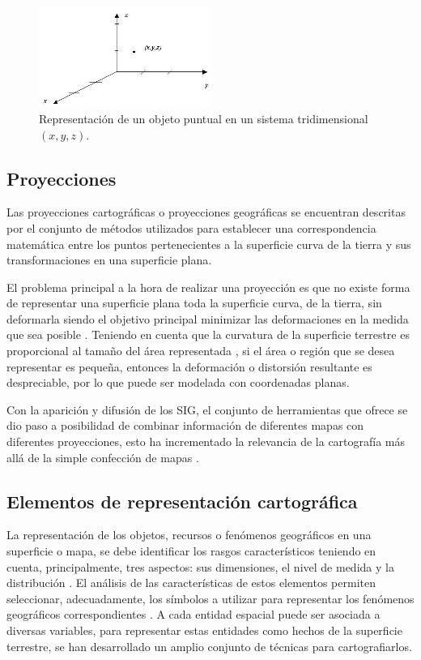 \begin{figure}[!htbp]
\centering
\includegraphics[width=0.5\textwidth]{capitulo-2/graphics/coordenadas-xyz.jpg}
\caption{\label{fig:sig-xyz} Representación de un objeto puntual en un sistema tridimensional
 $(x,y,z)$.}
\end{figure}

\subsection{Proyecciones}
Las proyecciones cartográficas o proyecciones geográficas se encuentran descritas por el conjunto
de métodos utilizados para establecer una correspondencia matemática entre los puntos pertenecientes a la superficie curva de la tierra y sus transformaciones en una superficie plana.

El problema principal a la hora de realizar una proyección es que no existe forma de representar
una superficie plana toda la superficie curva, de la tierra, sin deformarla siendo el objetivo
principal minimizar las deformaciones en la medida que sea posible \citep{fAlonsoSig2006}.
Teniendo en cuenta que la curvatura de la superficie terrestre es proporcional al tamaño del área
representada \citep{llopis2006sistemas}, si el área o región que se desea representar es pequeña,
entonces la deformación o distorsión resultante es despreciable, por lo que puede ser modelada con
coordenadas planas.

Con la aparición y difusión de los SIG, el conjunto de herramientas que ofrece se dio paso a
posibilidad de combinar información de diferentes mapas con diferentes proyecciones, esto ha
incrementado la relevancia de la cartografía más allá de la simple confección de mapas
\citep{llopis2006sistemas}.

\subsection{Elementos de representación cartográfica}
La representación de los objetos, recursos o fenómenos geográficos en una superficie o mapa, se
debe identificar los rasgos característicos teniendo en cuenta, principalmente, tres aspectos:
sus dimensiones, el nivel de medida y la distribución \citep{fomentoConceptos2010}. El análisis de
las características de estos elementos permiten seleccionar, adecuadamente, los símbolos a
utilizar para representar los fenómenos geográficos correspondientes \citep{fomentoConceptos2010}.
A cada entidad espacial puede ser asociada a diversas variables, para representar estas entidades
como hechos de la superficie terrestre, se han desarrollado un amplio conjunto de técnicas para
cartografiarlos.


